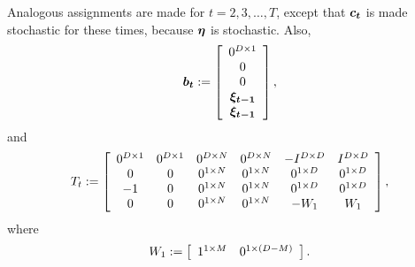 Analogous assignments are made for $t=2, 3, \ldots, T$, except that $\mathbf{\boldsymbol{c_t}}$ is made stochastic for these times, because $\mathbf{\boldsymbol{\eta}}$ is stochastic.  Also,
\begin{equation*}
\mathbf{\boldsymbol{b_t}} :=
 \left[
\begin{array}{c}
	0^{D\times 1}\\
	0\\
	0\\
	\mathbf{\boldsymbol{\xi_{t-1}}}\\
	\mathbf{\boldsymbol{\xi_{t-1}}}
\end{array}
\right],
\end{equation*}
and
\[
T_t :=
\left[
\begin{array}{cccccc}
	0^{D \times 1}	&	0^{D \times 1}	&	0^{D \times N}	&	0^{D \times N}	&	-I^{D\times D}	&	I^{D \times D}\\
	0	&	0	&	0^{1\times N}	&	0^{1\times N}	&	0^{1\times D}	&	0^{1\times D}\\
	-1	&	0	&	0^{1\times N}	&	0^{1\times N}	&	0^{1\times D}	&	0^{1\times D}\\	
	0	&	0	&	0^{1\times N}	&	0^{1\times N}	&	-W_1	&	W_1
\end{array}
\right],
\]
where
\begin{equation*}
W_1 := \left[\begin{array}{cc}
		1^{1\times M}	&	0^{1\times (D-M)}
	\end{array}
	\right].
\end{equation*}%

